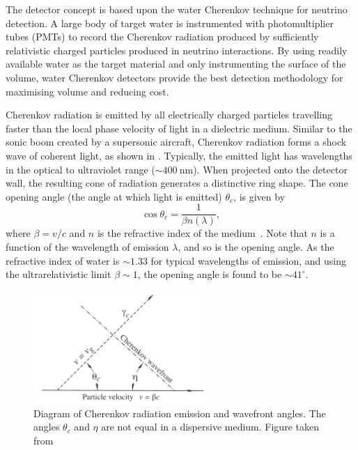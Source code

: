 The \chips detector concept is based upon the water Cherenkov technique for neutrino detection. A
large body of target water is instrumented with photomultiplier tubes (PMTs) to record the
Cherenkov radiation produced by sufficiently relativistic charged particles produced in neutrino
interactions. By using readily available water as the target material and only instrumenting the
surface of the volume, water Cherenkov detectors provide the best detection methodology for
maximising volume and reducing cost.

Cherenkov radiation is emitted by all electrically charged particles travelling faster than the
local phase velocity of light in a dielectric medium. Similar to the sonic boom created by a
supersonic aircraft, Cherenkov radiation forms a shock wave of coherent light, as shown in
. Typically, the emitted light has wavelengths in the optical to
ultraviolet range ($\sim400~\text{nm}$). When projected onto the detector wall, the resulting cone
of radiation generates a distinctive ring shape. The cone opening angle (the angle at which light
is emitted) $\theta_{c}$, is given by
\begin{equation}
    \cos\theta_{c} = \frac{1}{\beta n(\lambda)},
    \label{eq:cherenkov_angle}
\end{equation}
where $\beta=v/c$ and $n$ is the refractive index of the medium~\cite{particle2020}. Note that $n$
is a function of the wavelength of emission $\lambda$, and so is the opening angle. As the
refractive index of water is $\sim 1.33$ for typical wavelengths of emission, and using the
ultrarelativistic limit $\beta\sim 1$, the opening angle is found to be $\sim41^{\circ}$.

\begin{figure} %
    \includegraphics[width=0.6\textwidth]{diagrams/4-chips/cherenkov.pdf}
    \caption[Diagram of Cherenkov radiation emission]
    {Diagram of Cherenkov radiation emission and wavefront angles. The angles $\theta_{c}$ and
        $\eta$ are not equal in a dispersive medium. Figure taken from
        }
    \label{fig:cherenkov}
\end{figure}

